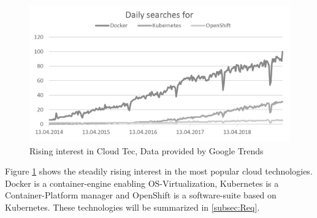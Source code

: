 \documentclass[english,utf8]{lni}
\begin{document}
\begin{figure}[h]
	\centering
	\includegraphics[width=0.75\linewidth]{imgs/DigDocker}
	\caption{Rising interest in Cloud Tec, Data provided by Google Trends}
	\label{fig:digdocker}	
\end{figure}

Figure \ref{fig:digdocker} shows the steadily rising interest in the most popular cloud technologies. 
Docker is a container-engine enabling OS-Virtualization, Kubernetes is a Container-Platform manager and OpenShift is a software-suite based on Kubernetes. 
These technologies will be summarized in \ref{subsec:Req}.  
\end{document}
